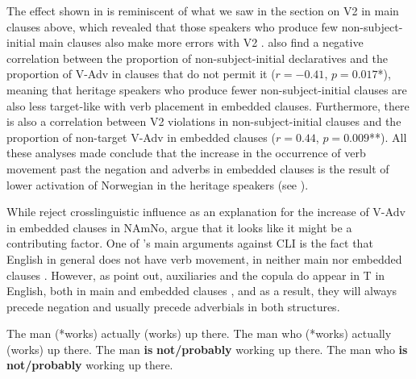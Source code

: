 \documentclass[output=paper]{langscibook}
\begin{document}
The effect shown in  is reminiscent of what we saw in the section on V2 in main clauses above, which revealed that those speakers who produce few non\hyp subject\hyp initial main clauses also make more errors with V2 \citep{WestergaardEtAl2021}. \citet{JensbergEtAl2024} also find a negative correlation between the proportion of non\hyp subject\hyp initial declaratives and the proportion of V-Adv in clauses that do not permit it ($r = -0.41$, $p = 0.017$*), meaning that heritage speakers who produce fewer non\hyp subject\hyp initial clauses are also less target\hyp like with verb placement in embedded clauses. Furthermore, there is also a correlation between V2 violations in non\hyp subject\hyp initial clauses and the proportion of non-target V-Adv in embedded clauses ($r = 0.44$, $p = 0.009$**). All these analyses made \citet{JensbergEtAl2024} conclude that the increase in the occurrence of verb movement past the negation and adverbs in embedded clauses is the result of lower activation of Norwegian in the heritage speakers (see \citealt{PutnamSanchez2013}).

While \citet{LarssonJohannessen2015Embedded,LarssonJohannessen2015Incomplete} reject crosslinguistic influence as an explanation for the increase of V-Adv in embedded clauses in NAmNo, \citet{JensbergEtAl2024} argue that it looks like it might be a contributing factor. One of \citeauthor{LarssonJohannessen2015Incomplete}’s main arguments against CLI is the fact that English in general does not have verb movement, in neither main  nor embedded clauses . However, as \citet{JensbergEtAl2024} point out, auxiliaries and the copula do appear in T in English, both in main and embedded clauses , and as a result, they will always precede negation and usually precede adverbials in both structures.

\ea%
    \label{ex:anderssen:20}
    \ea \label{ex:anderssen:20a} The man (*works) actually (works) up there.
	\ex \label{ex:anderssen:20b} The man who (*works) actually (works) up there.
	\z
\ex%
    \label{ex:anderssen:21}
	\ea \label{ex:anderssen:21a} The man \textbf{is} \textbf{not/probably} working up there.
	\ex \label{ex:anderssen:21b} The man who \textbf{is} \textbf{not/probably} working up there. 
	\z
\z
\end{document}
